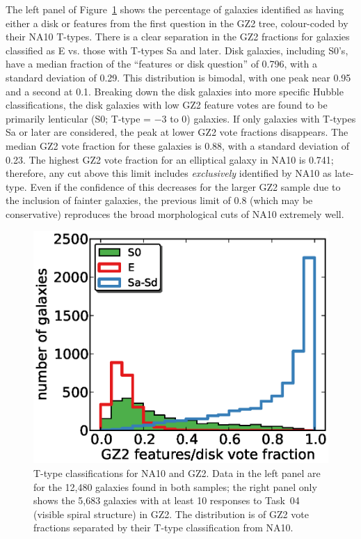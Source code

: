 \documentclass[useAMS,usenatbib]{mn2e}
\begin{document}
The left panel of Figure~\ref{fig-na_ttype} shows the percentage of galaxies identified as having either a disk or features from the first question in the GZ2 tree, colour-coded by their NA10 T-types. There is a clear separation in the GZ2 fractions for galaxies classified as E vs. those with T-types Sa and later. Disk galaxies, including S0's, have a median fraction of the ``features or disk question'' of 0.796, with a standard deviation of 0.29. This distribution is bimodal, with one peak near 0.95 and a second at 0.1. Breaking down the disk galaxies into more specific Hubble classifications, the disk galaxies with low GZ2 feature votes are found to be primarily lenticular (S0; T-type = $-3$ to 0) galaxies. If only galaxies with T-types Sa or later are considered, the peak at lower GZ2 vote fractions disappears. The median GZ2 vote fraction for these galaxies is 0.88, with a standard deviation of 0.23. The highest GZ2 vote fraction for an elliptical galaxy in NA10 is 0.741; therefore, any cut above this limit includes {\it exclusively} identified by NA10 as late-type. Even if the confidence of this decreases for the larger GZ2 sample due to the inclusion of fainter galaxies, the previous limit of 0.8 (which may be conservative) reproduces the broad morphological cuts of NA10 extremely well. 

\begin{figure}
\includegraphics[angle=0,width=7.0in]{figures/na_ttype.eps}
\caption{T-type classifications for NA10 and GZ2. Data in the left panel are for the 12,480 galaxies found in both samples; the right panel only shows the 5,683 galaxies with at least 10 responses to Task~04 (visible spiral structure) in GZ2. The distribution is of GZ2 vote fractions separated by their T-type classification from NA10. 
\label{fig-na_ttype}}
\end{figure}
\end{document}
